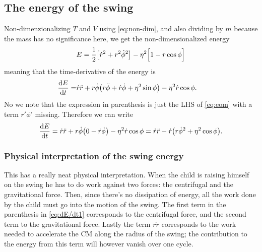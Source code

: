\subsection{The energy of the swing}
Non-dimenzionalizing $T$ and $V$ using \eqref{eq:non-dim}, %
and also dividing by $m$ because the mass has no significance here, we
get the non-dimensionalized energy  
\begin{equation}\label{eq:E}
E=\frac{1}{2}\qty[\dot{r}^2 + {r}^2\dot{\phi}^2] 
-\eta^2\Big[1-r\cos\phi\Big] 
\end{equation}
meaning that the time-derivative of the energy is
\begin{equation}
\begin{aligned}
\dv{E}{t}
=&\dot{r}\ddot{r}+r\dot\phi\qty(r\ddot\phi + \dot{r}\dot\phi + \eta^2\sin\phi) 
-\eta^2\dot{r}\cos\phi.
\end{aligned}
\end{equation}
No we note that the expression in parenthesis is just the LHS of
\eqref{eq:eom} with a term $r'\phi'$ missing. Therefore we can write
\begin{equation}\label{eq:dE/dt1}
\dv{E}{t}
=\dot{r}\ddot{r}+r\dot\phi\qty(0-\dot{r}\dot\phi)-\eta^2\dot{r}\cos\phi
=\dot{r}\ddot{r} - \dot{r}\qty(r\dot{\phi}^2 + \eta^2\cos\phi).
\end{equation}





\subsubsection{Physical interpretation of the swing energy}
\label{sec:phys_interp}
This has a really neat physical interpretation. When the child is
raising himself on the swing he has to do work against two forces:
the centrifugal and the gravitational force. Then, since there's no
dissipation of energy, all the work done by the child must go into the
motion of the swing. 
The first term in the parenthesis in \eqref{eq:dE/dt1} corresponds
to the centrifugal force, and the second term to the gravitational
force.
Lastly the term $\dot{r}\ddot{r}$ corresponds to the work needed to
accelerate the CM along the radius of the swing; the contribution to
the energy from this term will however vanish over one
cycle.\footnotemark{}   

